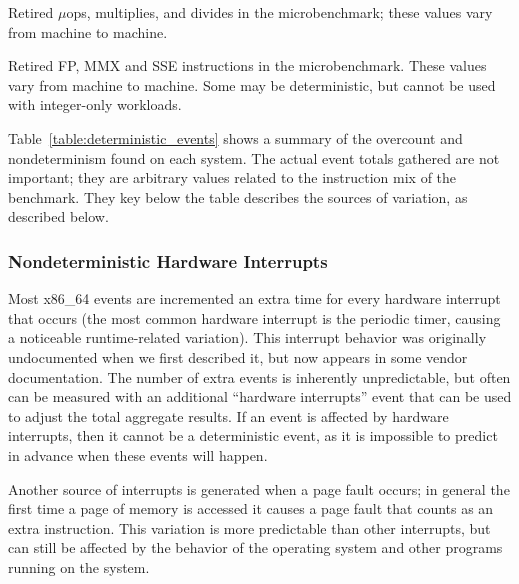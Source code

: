 
\begin{table*}[tbp]
\caption{Retired $\mu$ops, multiplies, and divides 
         in the microbenchmark;  these values vary from machine 
         to machine.}
\label{table:results_uops}

\centering

\end{table*}


\begin{table*}[tbp]

\caption{Retired FP, MMX and SSE instructions in the microbenchmark.
        These values vary from machine to machine.  
        Some may be
        deterministic, but cannot be used with integer-only 
        workloads.}
\label{table:results_fp}

\centering

\end{table*}


Table~\ref{table:deterministic_events} shows a summary of the overcount
and nondeterminism found on each system.  The actual event totals
gathered are not important; they are arbitrary values related to
the instruction mix of the benchmark.  They key below the table
describes the sources of variation, as described below.

\subsubsection{Nondeterministic Hardware Interrupts}

Most x86\_64 events are incremented an extra time for every hardware 
interrupt that occurs (the most common hardware interrupt is the 
periodic timer, causing a noticeable runtime-related variation).
This interrupt behavior was originally undocumented when we first
described it, but now appears in some vendor documentation.  
The number of extra events is inherently unpredictable,
but often can be measured with an additional ``hardware interrupts''
event that can be used to adjust the total aggregate results.  
If an event is affected by hardware interrupts, then it cannot be a 
deterministic event, as it is impossible to predict in advance when
these events will happen.

Another source of interrupts is generated
when a page fault occurs; in general
the first time a page of memory is accessed it causes a page fault 
that counts as an extra instruction.  This variation is more predictable
than other interrupts, but can still be affected by the behavior of
the operating system and other programs running on the system.

